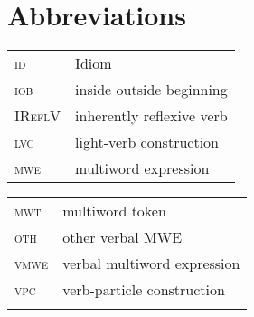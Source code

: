 \documentclass[output=paper,modfonts]{langscibook}
\begin{document}
\section*{Abbreviations}

\begin{tabularx}{.49\textwidth}{ll}
\textsc{id} & Idiom\\ 
\textsc{iob}& inside outside beginning\\ 
\textsc{IReflV} & inherently reflexive verb  \\
\textsc{lvc} & light-verb construction  \\
\textsc{mwe} & multiword expression  \\
\end{tabularx}
\begin{tabularx}{.49\textwidth}{ll}
\textsc{mwt} & multiword token  \\
\textsc{oth} & other verbal MWE \\
\textsc{vmwe} & verbal multiword expression \\
\textsc{vpc} & verb-particle construction  \\ 
\\
\end{tabularx}
\largerpage
 
{\sloppy
\printbibliography[heading=subbibliography,notkeyword=this]
}
\end{document}
